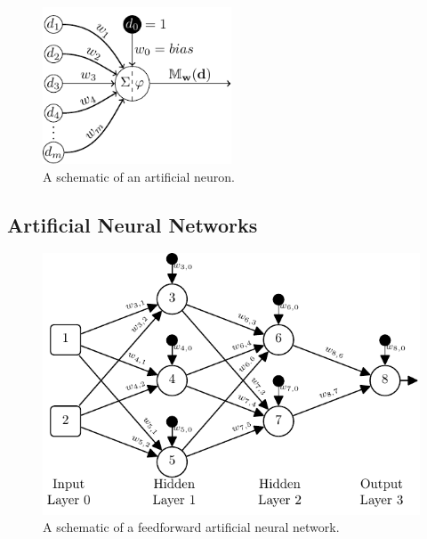 \documentclass[xcolor={table}]{beamer}
\begin{document}
 \begin{frame} 
\begin{figure}[t]
\centerline{
\includegraphics[width=0.5\textwidth]{./images/fmlpda_8_03.pdf}
}
\caption[A schematic of an artificial neuron.]{A schematic of an artificial neuron.}
\label{fig:artificalneuron}
\end{figure}
\end{frame} 

\subsection{Artificial Neural Networks}

 \begin{frame} 
\begin{figure}[t]
\centerline{
\includegraphics[width=\textwidth]{./images/fmlpda_8_04.pdf}
}
\caption[A schematic of a feedforward artificial neural network.]{A schematic of a feedforward artificial neural network.}
\label{fig:artificialneuralnetwork}
\end{figure}
\end{frame} 
\end{document}
